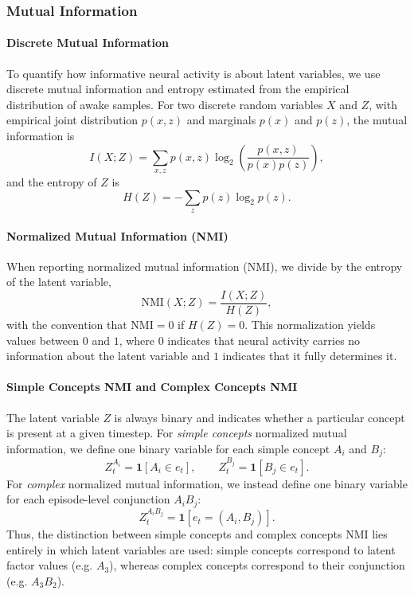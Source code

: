 \documentclass{article}
\begin{document}
\subsubsection*{Mutual Information}
\paragraph*{Discrete Mutual Information}
To quantify how informative neural activity is about latent variables, we use discrete mutual information and entropy estimated from the empirical distribution of awake samples. For two discrete random variables $X$ and $Z$, with empirical joint distribution $p(x,z)$ and marginals $p(x)$ and $p(z)$, the mutual information is
\[
I(X;Z)
=
\sum_{x,z} p(x,z)\log_2\!\left(\frac{p(x,z)}{p(x)p(z)}\right),
\]
and the entropy of $Z$ is
\[
H(Z)
=
-\sum_z p(z)\log_2 p(z).
\]
\paragraph*{Normalized Mutual Information (NMI)}
When reporting normalized mutual information (NMI), we divide by the entropy of the latent variable,
\[
\mathrm{NMI}(X;Z)
=
\frac{I(X;Z)}{H(Z)},
\]
with the convention that $\mathrm{NMI}=0$ if $H(Z)=0$. This normalization yields values between $0$ and $1$, where $0$ indicates that neural activity carries no information about the latent variable and $1$ indicates that it fully determines it.
\paragraph{Simple Concepts NMI and Complex Concepts NMI}
The latent variable $Z$ is always binary and indicates whether a particular concept is present at a given timestep. For \textit{simple concepts} normalized mutual information, we define one binary variable for each simple concept $A_i$ and $B_j$:
\[
Z_t^{A_i} = \mathbf{1}[A_i \in e_t],
\qquad
Z_t^{B_j} = \mathbf{1}[B_j \in e_t].
\]
For \textit{complex} normalized mutual information, we instead define one binary variable for each episode-level conjunction $A_iB_j$:
\[
Z_t^{A_iB_j} = \mathbf{1}[e_t = (A_i,B_j)].
\]
Thus, the distinction between simple concepts and complex concepts NMI lies entirely in which latent variables are used: simple concepts correspond to latent factor values (e.g. $A_3$), whereas complex concepts correspond to their conjunction (e.g. $A_3B_2$).
\newline\newline
\end{document}
